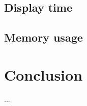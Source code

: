 \documentclass[acmtocl,acmnow]{acmtrans2m}
\begin{document}
\subsection{Display time}


\subsection{Memory usage}


\section{Conclusion}








\begin{received}
...
\end{received}
\end{document}
